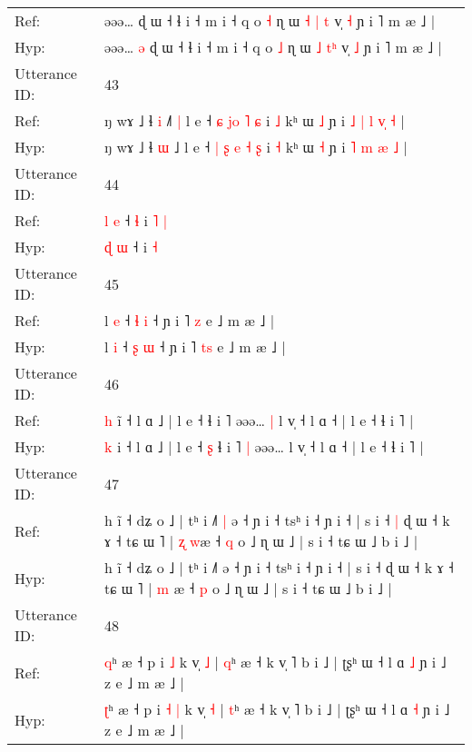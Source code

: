\documentclass[10pt]{article}
\DeclareRobustCommand{\hl}[1]{{\textcolor{red}{#1}}}
\begin{document}
\begin{longtable}{ll}
Ref: & əəə…\hl{}\hl{} ɖ ɯ ˧ ɬ i ˧ m i ˧ q o \hl{˧} ɳ ɯ \hl{˧} \hl{|}\hl{ }\hl{t} v̩ \hl{˧} ɲ i ˥ m æ ˩ |
 \\
Hyp: & əəə…\hl{ }\hl{ə} ɖ ɯ ˧ ɬ i ˧ m i ˧ q o \hl{˩} ɳ ɯ \hl{˩} \hl{}\hl{t}\hl{ʰ} v̩ \hl{˩} ɲ i ˥ m æ ˩ |
 \\
\midrule
Utterance ID: & 43 \\
Ref: & ŋ wɤ ˩ ɬ \hl{i} ˩\hl{˥}\hl{ }\hl{|} l e ˧ \hl{ɕ} \hl{}\hl{j}\hl{o} \hl{˥} \hl{ɕ} i \hl{˩} kʰ ɯ \hl{˩} ɲ i\hl{ }\hl{˩} \hl{|} \hl{l} \hl{v}\hl{̩} \hl{˧} |
 \\
Hyp: & ŋ wɤ ˩ ɬ \hl{ɯ} ˩\hl{}\hl{}\hl{} l e ˧ \hl{|} \hl{ʂ}\hl{ }\hl{e} \hl{˧} \hl{ʂ} i \hl{˧} kʰ ɯ \hl{˧} ɲ i\hl{}\hl{} \hl{˥} \hl{m} \hl{}\hl{æ} \hl{˩} |
 \\
\midrule
Utterance ID: & 44 \\
Ref: & \hl{l} \hl{e} ˧\hl{ }\hl{ɬ} i\hl{ }\hl{˥} \hl{|}
 \\
Hyp: & \hl{ɖ} \hl{ɯ} ˧\hl{}\hl{} i\hl{}\hl{} \hl{˧}
 \\
\midrule
Utterance ID: & 45 \\
Ref: & l \hl{e} ˧ \hl{ɬ} \hl{i} ˧ ɲ i ˥ \hl{}\hl{z} e ˩ m æ ˩ |
 \\
Hyp: & l \hl{i} ˧ \hl{ʂ} \hl{ɯ} ˧ ɲ i ˥ \hl{t}\hl{s} e ˩ m æ ˩ |
 \\
\midrule
Utterance ID: & 46 \\
Ref: & \hl{h} i\hl{̃} ˧ l ɑ ˩ | l e ˧\hl{}\hl{} ɬ i ˥\hl{}\hl{} əəə…\hl{ }\hl{|} l v̩ ˧ l ɑ ˧ | l e ˧ ɬ i ˥ |
 \\
Hyp: & \hl{k} i\hl{} ˧ l ɑ ˩ | l e ˧\hl{ }\hl{ʂ} ɬ i ˥\hl{ }\hl{|} əəə…\hl{}\hl{} l v̩ ˧ l ɑ ˧ | l e ˧ ɬ i ˥ |
 \\
\midrule
Utterance ID: & 47 \\
Ref: & h ĩ ˧ dʑ o ˩ | tʰ i ˩˥\hl{ }\hl{|} ə ˧ ɲ i ˧ tsʰ i ˧ ɲ i ˧ | s i ˧\hl{ }\hl{|} ɖ ɯ ˧ k ɤ ˧ tɕ ɯ ˥ | \hl{ʐ} \hl{w}æ ˧ \hl{q} o ˩ ɳ ɯ ˩ | s i ˧ tɕ ɯ ˩ b i ˩ |
 \\
Hyp: & h ĩ ˧ dʑ o ˩ | tʰ i ˩˥\hl{}\hl{} ə ˧ ɲ i ˧ tsʰ i ˧ ɲ i ˧ | s i ˧\hl{}\hl{} ɖ ɯ ˧ k ɤ ˧ tɕ ɯ ˥ | \hl{m} \hl{}æ ˧ \hl{p} o ˩ ɳ ɯ ˩ | s i ˧ tɕ ɯ ˩ b i ˩ |
 \\
\midrule
Utterance ID: & 48 \\
Ref: & \hl{q}ʰ æ ˧ p i\hl{}\hl{} \hl{˩} k v̩ \hl{˩} | \hl{q}ʰ æ ˧ k v̩ ˥ b i ˩ | ʈʂʰ ɯ ˧ l ɑ \hl{˩} ɲ i ˩ z e ˩ m æ ˩ |
 \\
Hyp: & \hl{ʈ}ʰ æ ˧ p i\hl{ }\hl{˧} \hl{|} k v̩ \hl{˧} | \hl{t}ʰ æ ˧ k v̩ ˥ b i ˩ | ʈʂʰ ɯ ˧ l ɑ \hl{˧} ɲ i ˩ z e ˩ m æ ˩ |
 \\
\midrule

\end{longtable}
\end{document}
